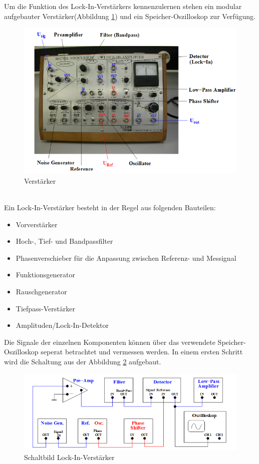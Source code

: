 Um die Funktion des Lock-In-Verstärkers kennenzulernen stehen ein modular
aufgebauter Verstärker(Abbildung \ref{fig:verstärker}) und ein
Speicher-Oszilloskop zur Verfügung.
\begin{figure}[h]
  \centering
  \includegraphics[width=\textwidth]{Bilder/Verstaerker.jpeg}
  \caption{Verstärker}
  \label{fig:verstärker}
\end{figure}
\\
Ein Lock-In-Verstärker besteht in der Regel aus folgenden Bauteilen:
\begin{itemize}
  \item Vorverstärker
  \item Hoch-, Tief- und Bandpassfilter
  \item Phasenverschieber für die Anpassung zwischen Referenz- und Messignal
  \item Funktionsgenerator
  \item Rauschgenerator
  \item Tiefpass-Verstärker
  \item Amplituden/Lock-In-Detektor
\end{itemize}
Die Signale der einzelnen Komponenten können über das verwendete
Speicher-Oszilloskop seperat betrachtet und vermessen werden.
\newpage
In einem ersten Schritt wird die Schaltung aus der Abbildung \ref{fig:schalt}
aufgebaut.
\begin{figure}[h]
  \centering
  \includegraphics[width=\textwidth]{Bilder/Schaltung.jpeg}
  \caption{Schaltbild Lock-In-Verstärker}
  \label{fig:schalt}
\end{figure}
